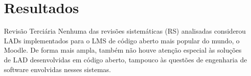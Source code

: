 \section{Resultados}

\begin{frame}{Revisão Terciária}
Nenhuma das revisões sistemáticas (RS) analisadas considerou LADs implementados para o LMS de código aberto mais popular do mundo, o Moodle. De forma mais ampla, também não houve atenção especial às soluções de LAD desenvolvidas em código aberto, tampouco às questões de engenharia de software envolvidas nesses sistemas.
\end{frame}


